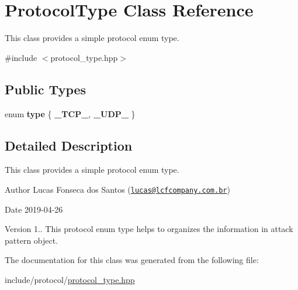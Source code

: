 \hypertarget{classProtocolType}{}\section{Protocol\+Type Class Reference}
\label{classProtocolType}


This class provides a simple protocol enum type.  




{\ttfamily \#include $<$protocol\+\_\+type.\+hpp$>$}

\subsection*{Public Types}
\begin{DoxyCompactItemize}
\item 
\mbox{\label{classProtocolType_ab32b5447853f9c960ba2631bc3f6a9cf}} 
enum {\bfseries type} \{ {\bfseries \+\_\+\+T\+C\+P\+\_\+}, 
{\bfseries \+\_\+\+U\+D\+P\+\_\+}
 \}
\end{DoxyCompactItemize}


\subsection{Detailed Description}
This class provides a simple protocol enum type. 

\begin{DoxyAuthor}{Author}
Lucas Fonseca dos Santos (\href{mailto:lucas@lcfcompany.com.br}{\tt lucas@lcfcompany.\+com.\+br}) 
\end{DoxyAuthor}
\begin{DoxyDate}{Date}
2019-\/04-\/26 
\end{DoxyDate}
\begin{DoxyVersion}{Version}
1.. This protocol enum type helps to organizes the information in attack pattern object. 
\end{DoxyVersion}


The documentation for this class was generated from the following file\+:\begin{DoxyCompactItemize}
\item 
include/protocol/\mbox{\hyperlink{protocol__type_8hpp}{protocol\+\_\+type.\+hpp}}\end{DoxyCompactItemize}

